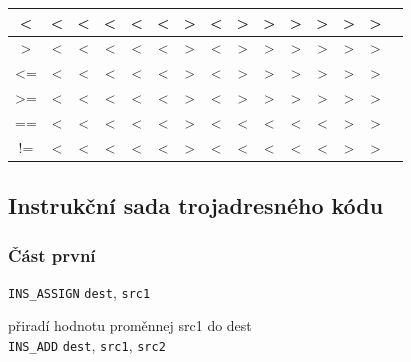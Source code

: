 \documentclass[a4paper, 12pt]{article}
\begin{document}
\begin{center}
\begin{tabular}{|c||c|c|c|c|c|c|c|c|c|c|c|c|c|c|}
\textless     & \textless & \textless & \textless & \textless & \textless & \textgreater & \textless & \textgreater        & \textgreater           & \textgreater         & \textgreater            & \textgreater & \textgreater \\ \hline
\textgreater  & \textless & \textless & \textless & \textless & \textless & \textgreater & \textless & \textgreater        & \textgreater           & \textgreater         & \textgreater            & \textgreater & \textgreater \\ \hline
\textless=    & \textless & \textless & \textless & \textless & \textless & \textgreater & \textless & \textgreater        & \textgreater           & \textgreater         & \textgreater            & \textgreater & \textgreater \\ \hline
\textgreater= & \textless & \textless & \textless & \textless & \textless & \textgreater & \textless & \textgreater        & \textgreater           & \textgreater         & \textgreater            & \textgreater & \textgreater \\ \hline
==            & \textless & \textless & \textless & \textless & \textless & \textgreater & \textless & \textless        & \textless           & \textless         & \textless            & \textgreater & \textgreater \\ \hline
!=            & \textless & \textless & \textless & \textless & \textless & \textgreater & \textless & \textless        & \textless           & \textless         & \textless            & \textgreater & \textgreater \\ \hline
\end{tabular}
\end{center}
\newpage

\subsection{Instrukční sada trojadresného kódu} \label{instrukce}

\subsubsection*{Část první}

\texttt{INS\_ASSIGN} \texttt{dest}, \texttt{src1}

přiradí hodnotu proměnnej src1 do dest\\
\texttt{INS\_ADD} \texttt{dest}, \texttt{src1}, \texttt{src2}
\end{document}
